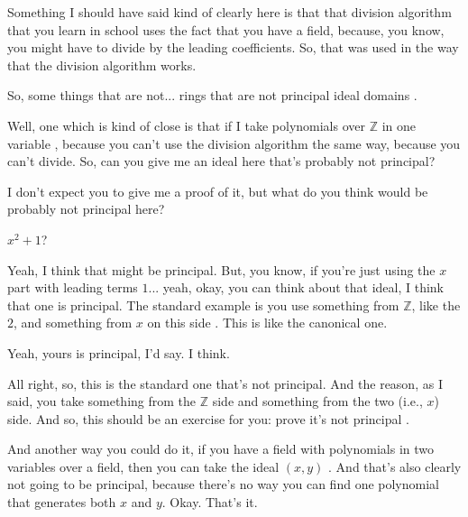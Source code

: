 \begin{speech}[00:39:52 - 00:40:44]
Something I should have said kind of clearly here is that that division algorithm that you learn in school uses the fact that you have a field, because, you know, you might have to divide by the leading coefficients. So, that was used in the way that the division algorithm works.

So, some things that are not... rings that are not principal ideal domains .

Well, one which is kind of close is that if I take polynomials over $\mathbb{Z}$ in one variable , because you can't use the division algorithm the same way, because you can't divide. So, can you give me an ideal here that's probably not principal?

I don't expect you to give me a proof of it, but what do you think would be probably not principal here?
\end{speech}

\begin{student}
$x^2 + 1$?
\end{student}

\begin{speech}[00:40:48 - 00:42:03]
Yeah, I think that might be principal. But, you know, if you're just using the $x$ part with leading terms $1$... yeah, okay, you can think about that ideal, I think that one is principal. The standard example is you use something from $\mathbb{Z}$, like the $2$, and something from $x$ on this side . This is like the canonical one.

Yeah, yours is principal, I'd say. I think.

All right, so, this is the standard one that's not principal. And the reason, as I said, you take something from the $\mathbb{Z}$ side and something from the two (i.e., $x$) side. And so, this should be an exercise for you: prove it's not principal .

And another way you could do it, if you have a field with polynomials in two variables over a field, then you can take the ideal $(x, y)$ . And that's also clearly not going to be principal, because there's no way you can find one polynomial that generates both $x$ and $y$. Okay. That's it. 
\end{speech}

